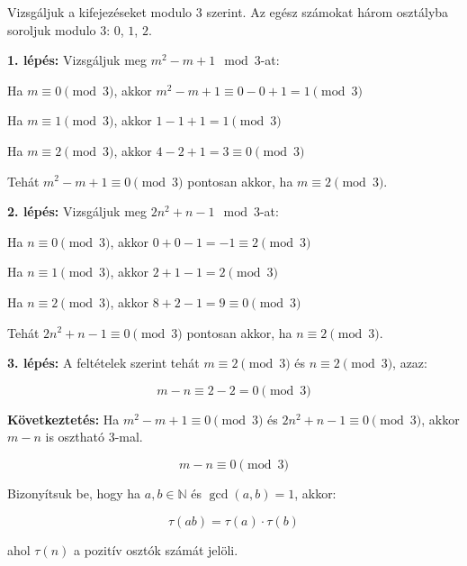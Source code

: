 \begin{solution}
Vizsgáljuk a kifejezéseket modulo 3 szerint. Az egész számokat három
osztályba soroljuk modulo 3: $0$, $1$, $2$.

\medskip{}

\textbf{1. lépés:} Vizsgáljuk meg $m^{2}-m+1\mod 3$-at:

Ha $m\equiv0\pmod 3$, akkor $m^{2}-m+1\equiv0-0+1=1\pmod 3$

Ha $m\equiv1\pmod 3$, akkor $1-1+1=1\pmod 3$

Ha $m\equiv2\pmod 3$, akkor $4-2+1=3\equiv0\pmod 3$

Tehát $m^{2}-m+1\equiv0\pmod 3$ pontosan akkor, ha $m\equiv2\pmod 3$.

\medskip{}

\textbf{2. lépés:} Vizsgáljuk meg $2n^{2}+n-1\mod 3$-at:

Ha $n\equiv0\pmod 3$, akkor $0+0-1=-1\equiv2\pmod 3$

Ha $n\equiv1\pmod 3$, akkor $2+1-1=2\pmod 3$

Ha $n\equiv2\pmod 3$, akkor $8+2-1=9\equiv0\pmod 3$

Tehát $2n^{2}+n-1\equiv0\pmod 3$ pontosan akkor, ha $n\equiv2\pmod 3$.

\medskip{}

\textbf{3. lépés:} A feltételek szerint tehát $m\equiv2\pmod 3$ és
$n\equiv2\pmod 3$, azaz:

\[
m-n\equiv2-2=0\pmod 3
\]

\medskip{}

\textbf{Következtetés:} Ha $m^{2}-m+1\equiv0\pmod 3$ és $2n^{2}+n-1\equiv0\pmod 3$,
akkor $m-n$ is osztható 3-mal.

\[
\boxed{m-n\equiv0\pmod 3}
\]
\end{solution}
\begin{extraproblem}
Bizonyítsuk be, hogy ha $a,b\in\mathbb{N}$ és $\gcd(a,b)=1$, akkor:

\[
\tau(ab)=\tau(a)\cdot\tau(b)
\]

ahol $\tau(n)$ a pozitív osztók számát jelöli.
\end{extraproblem}

